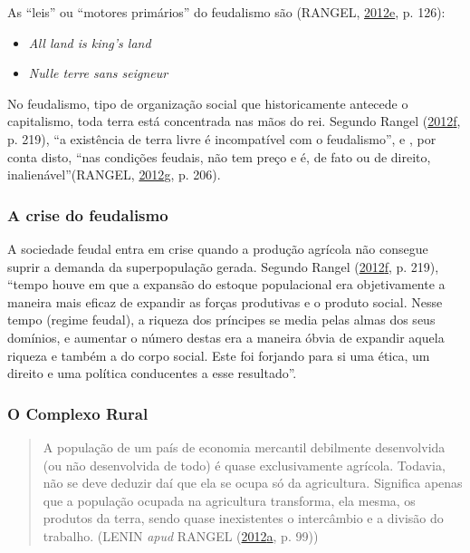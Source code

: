 \documentclass[a4paper, 12pt]{article}
\providecommand{\tightlist}{%
  \setlength{\itemsep}{0pt}\setlength{\parskip}{0pt}}
\begin{document}
As ``leis'' ou ``motores primários'' do feudalismo são (RANGEL,
\protect\hyperlink{ref-rangel1985}{2012}\protect\hyperlink{ref-rangel1985}{e},
p. 126):

\begin{itemize}
\tightlist
\item
  \emph{All land is king's land}
\item
  \emph{Nulle terre sans seigneur}
\end{itemize}

No feudalismo, tipo de organização social que historicamente antecede o
capitalismo, toda terra está concentrada nas mãos do rei. Segundo Rangel
(\protect\hyperlink{ref-rangel1961}{2012}\protect\hyperlink{ref-rangel1961}{f},
p. 219), ``a existência de terra livre é incompatível com o
feudalismo'', e , por conta disto, ``nas condições feudais, não tem
preço e é, de fato ou de direito, inalienável''(RANGEL,
\protect\hyperlink{ref-rangel1960}{2012}\protect\hyperlink{ref-rangel1960}{g},
p. 206).

\hypertarget{a-crise-do-feudalismo}{%
\subsubsection{A crise do feudalismo}\label{a-crise-do-feudalismo}}

A sociedade feudal entra em crise quando a produção agrícola não
consegue suprir a demanda da superpopulação gerada. Segundo Rangel
(\protect\hyperlink{ref-rangel1961}{2012}\protect\hyperlink{ref-rangel1961}{f},
p. 219), ``tempo houve em que a expansão do estoque populacional era
objetivamente a maneira mais eficaz de expandir as forças produtivas e o
produto social. Nesse tempo (regime feudal), a riqueza dos príncipes se
media pelas almas dos seus domínios, e aumentar o número destas era a
maneira óbvia de expandir aquela riqueza e também a do corpo social.
Este foi forjando para si uma ética, um direito e uma política
conducentes a esse resultado''.

\hypertarget{o-complexo-rural}{%
\subsubsection{O Complexo Rural}\label{o-complexo-rural}}

\begin{quote}
A população de um país de economia mercantil debilmente desenvolvida (ou
não desenvolvida de todo) é quase exclusivamente agrícola. Todavia, não
se deve deduzir daí que ela se ocupa só da agricultura. Significa apenas
que a população ocupada na agricultura transforma, ela mesma, os
produtos da terra, sendo quase inexistentes o intercâmbio e a divisão do
trabalho. (LENIN \emph{apud} RANGEL
(\protect\hyperlink{ref-rangel1954}{2012}\protect\hyperlink{ref-rangel1954}{a},
p. 99))
\end{quote}
\end{document}
